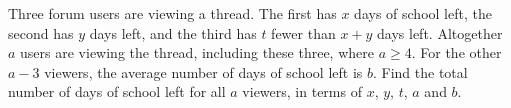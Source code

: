 Three forum users are viewing a thread. The first has $x$ days of school left, the second has $y$ days left, and the third has $t$ fewer than $x+y$ days left. Altogether $a$ users are viewing the thread, including these three, where $a\ge4$. For the other $a-3$ viewers, the average number of days of school left is $b$. Find the total number of days of school left for all $a$ viewers, in terms of $x$, $y$, $t$, $a$ and $b$.
